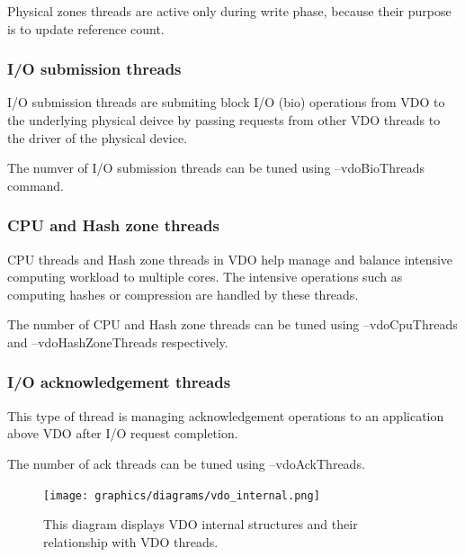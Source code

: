 \documentclass[
  color, %
  table, %
  lof,   %
  lot,   %
]{fithesis3}
\begin{document}
Physical zones threads are active only during write phase, because their purpose is to update reference count.


\subsubsection{I/O submission threads}
I/O submission threads are submiting block I/O (bio) operations from VDO to the underlying physical deivce by passing requests from other VDO threads to the driver of the physical device. 

The numver of I/O submission threads can be tuned using --vdoBioThreads command.

\subsubsection{CPU and Hash zone threads}
CPU threads and Hash zone threads in VDO help manage and balance intensive computing workload to multiple cores. The intensive operations such as computing hashes or compression are handled by these threads.

The number of CPU and Hash zone threads can be tuned using --vdoCpuThreads and --vdoHashZoneThreads respectively.

\subsubsection{I/O acknowledgement threads}
This type of thread is managing acknowledgement operations to an application above VDO after I/O request completion.

The number of ack threads can be tuned using --vdoAckThreads.




\addtolength{\textheight}{1.75in}
\begin{landscape}
\begin{figure}[!hb]
        \centering
        \texttt{[image: graphics/diagrams/vdo\_internal.png]}
\caption[VDO threads and internal structures]{This diagram displays VDO internal structures and their relationship with VDO threads.}
\label{fig:VDO-internals}
\end{figure}
\end{landscape}
\addtolength{\textheight}{-1.75in}
\end{document}
